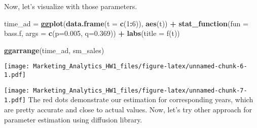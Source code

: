 \documentclass[
]{article}
\newenvironment{Shaded}{\begin{snugshade}}{\end{snugshade}}
\newcommand{\AttributeTok}[1]{\textcolor[rgb]{0.13,0.29,0.53}{#1}}
\newcommand{\DecValTok}[1]{\textcolor[rgb]{0.00,0.00,0.81}{#1}}
\newcommand{\FloatTok}[1]{\textcolor[rgb]{0.00,0.00,0.81}{#1}}
\newcommand{\FunctionTok}[1]{\textcolor[rgb]{0.13,0.29,0.53}{\textbf{#1}}}
\newcommand{\NormalTok}[1]{#1}
\newcommand{\OtherTok}[1]{\textcolor[rgb]{0.56,0.35,0.01}{#1}}
\newcommand{\SpecialCharTok}[1]{\textcolor[rgb]{0.81,0.36,0.00}{\textbf{#1}}}
\newcommand{\StringTok}[1]{\textcolor[rgb]{0.31,0.60,0.02}{#1}}
\begin{document}
Now, let's visualize with those parameters.

\begin{Shaded}
\begin{Highlighting}[]
\NormalTok{time\_ad }\OtherTok{=} \FunctionTok{ggplot}\NormalTok{(}\FunctionTok{data.frame}\NormalTok{(}\AttributeTok{t =} \FunctionTok{c}\NormalTok{(}\DecValTok{1}\SpecialCharTok{:}\DecValTok{6}\NormalTok{)), }\FunctionTok{aes}\NormalTok{(t)) }\SpecialCharTok{+}
\FunctionTok{stat\_function}\NormalTok{(}\AttributeTok{fun =}\NormalTok{ bass.f, }\AttributeTok{args =} \FunctionTok{c}\NormalTok{(}\AttributeTok{p=}\FloatTok{0.005}\NormalTok{, }\AttributeTok{q=}\FloatTok{0.369}\NormalTok{)) }\SpecialCharTok{+}
\FunctionTok{labs}\NormalTok{(}\AttributeTok{title =} \StringTok{\textquotesingle{}f(t)\textquotesingle{}}\NormalTok{)}

\FunctionTok{ggarrange}\NormalTok{(time\_ad, sm\_sales)}
\end{Highlighting}
\end{Shaded}

\texttt{[image: Marketing\_Analytics\_HW1\_files/figure-latex/unnamed-chunk-6-1.pdf]}

\begin{Shaded}
\end{Shaded}

\texttt{[image: Marketing\_Analytics\_HW1\_files/figure-latex/unnamed-chunk-7-1.pdf]}
The red dots demonstrate our estimation for corresponding years, which
are pretty accurate and close to actual values. Now, let's try other
approach for parameter estimation using diffusion library.
\end{document}
